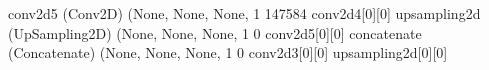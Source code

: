 \documentclass[letterpaper,10pt,english]{sphinxmanual}
\begin{document}
\begin{sphinxVerbatim}[commandchars=\\\{\}]
conv2d\PYGZus{}5 (Conv2D)               (None, None, None, 1 147584      conv2d\PYGZus{}4[0][0]                   
\PYGZus{}\PYGZus{}\PYGZus{}\PYGZus{}\PYGZus{}\PYGZus{}\PYGZus{}\PYGZus{}\PYGZus{}\PYGZus{}\PYGZus{}\PYGZus{}\PYGZus{}\PYGZus{}\PYGZus{}\PYGZus{}\PYGZus{}\PYGZus{}\PYGZus{}\PYGZus{}\PYGZus{}\PYGZus{}\PYGZus{}\PYGZus{}\PYGZus{}\PYGZus{}\PYGZus{}\PYGZus{}\PYGZus{}\PYGZus{}\PYGZus{}\PYGZus{}\PYGZus{}\PYGZus{}\PYGZus{}\PYGZus{}\PYGZus{}\PYGZus{}\PYGZus{}\PYGZus{}\PYGZus{}\PYGZus{}\PYGZus{}\PYGZus{}\PYGZus{}\PYGZus{}\PYGZus{}\PYGZus{}\PYGZus{}\PYGZus{}\PYGZus{}\PYGZus{}\PYGZus{}\PYGZus{}\PYGZus{}\PYGZus{}\PYGZus{}\PYGZus{}\PYGZus{}\PYGZus{}\PYGZus{}\PYGZus{}\PYGZus{}\PYGZus{}\PYGZus{}\PYGZus{}\PYGZus{}\PYGZus{}\PYGZus{}\PYGZus{}\PYGZus{}\PYGZus{}\PYGZus{}\PYGZus{}\PYGZus{}\PYGZus{}\PYGZus{}\PYGZus{}\PYGZus{}\PYGZus{}\PYGZus{}\PYGZus{}\PYGZus{}\PYGZus{}\PYGZus{}\PYGZus{}\PYGZus{}\PYGZus{}\PYGZus{}\PYGZus{}\PYGZus{}\PYGZus{}\PYGZus{}\PYGZus{}\PYGZus{}\PYGZus{}\PYGZus{}\PYGZus{}
up\PYGZus{}sampling2d (UpSampling2D)    (None, None, None, 1 0           conv2d\PYGZus{}5[0][0]                   
\PYGZus{}\PYGZus{}\PYGZus{}\PYGZus{}\PYGZus{}\PYGZus{}\PYGZus{}\PYGZus{}\PYGZus{}\PYGZus{}\PYGZus{}\PYGZus{}\PYGZus{}\PYGZus{}\PYGZus{}\PYGZus{}\PYGZus{}\PYGZus{}\PYGZus{}\PYGZus{}\PYGZus{}\PYGZus{}\PYGZus{}\PYGZus{}\PYGZus{}\PYGZus{}\PYGZus{}\PYGZus{}\PYGZus{}\PYGZus{}\PYGZus{}\PYGZus{}\PYGZus{}\PYGZus{}\PYGZus{}\PYGZus{}\PYGZus{}\PYGZus{}\PYGZus{}\PYGZus{}\PYGZus{}\PYGZus{}\PYGZus{}\PYGZus{}\PYGZus{}\PYGZus{}\PYGZus{}\PYGZus{}\PYGZus{}\PYGZus{}\PYGZus{}\PYGZus{}\PYGZus{}\PYGZus{}\PYGZus{}\PYGZus{}\PYGZus{}\PYGZus{}\PYGZus{}\PYGZus{}\PYGZus{}\PYGZus{}\PYGZus{}\PYGZus{}\PYGZus{}\PYGZus{}\PYGZus{}\PYGZus{}\PYGZus{}\PYGZus{}\PYGZus{}\PYGZus{}\PYGZus{}\PYGZus{}\PYGZus{}\PYGZus{}\PYGZus{}\PYGZus{}\PYGZus{}\PYGZus{}\PYGZus{}\PYGZus{}\PYGZus{}\PYGZus{}\PYGZus{}\PYGZus{}\PYGZus{}\PYGZus{}\PYGZus{}\PYGZus{}\PYGZus{}\PYGZus{}\PYGZus{}\PYGZus{}\PYGZus{}\PYGZus{}\PYGZus{}\PYGZus{}
concatenate (Concatenate)       (None, None, None, 1 0           conv2d\PYGZus{}3[0][0]                   
                                                                 up\PYGZus{}sampling2d[0][0]              
\PYGZus{}\PYGZus{}\PYGZus{}\PYGZus{}\PYGZus{}\PYGZus{}\PYGZus{}\PYGZus{}\PYGZus{}\PYGZus{}\PYGZus{}\PYGZus{}\PYGZus{}\PYGZus{}\PYGZus{}\PYGZus{}\PYGZus{}\PYGZus{}\PYGZus{}\PYGZus{}\PYGZus{}\PYGZus{}\PYGZus{}\PYGZus{}\PYGZus{}\PYGZus{}\PYGZus{}\PYGZus{}\PYGZus{}\PYGZus{}\PYGZus{}\PYGZus{}\PYGZus{}\PYGZus{}\PYGZus{}\PYGZus{}\PYGZus{}\PYGZus{}\PYGZus{}\PYGZus{}\PYGZus{}\PYGZus{}\PYGZus{}\PYGZus{}\PYGZus{}\PYGZus{}\PYGZus{}\PYGZus{}\PYGZus{}\PYGZus{}\PYGZus{}\PYGZus{}\PYGZus{}\PYGZus{}\PYGZus{}\PYGZus{}\PYGZus{}\PYGZus{}\PYGZus{}\PYGZus{}\PYGZus{}\PYGZus{}\PYGZus{}\PYGZus{}\PYGZus{}\PYGZus{}\PYGZus{}\PYGZus{}\PYGZus{}\PYGZus{}\PYGZus{}\PYGZus{}\PYGZus{}\PYGZus{}\PYGZus{}\PYGZus{}\PYGZus{}\PYGZus{}\PYGZus{}\PYGZus{}\PYGZus{}\PYGZus{}\PYGZus{}\PYGZus{}\PYGZus{}\PYGZus{}\PYGZus{}\PYGZus{}\PYGZus{}\PYGZus{}\PYGZus{}\PYGZus{}\PYGZus{}\PYGZus{}\PYGZus{}\PYGZus{}\PYGZus{}\PYGZus{}

\end{sphinxVerbatim}
\end{document}
